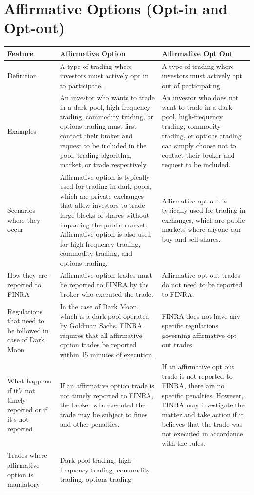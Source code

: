 \documentclass[11pt]{article}
\begin{document}
\section{Affirmative Options (Opt-in and Opt-out)}
\label{sec:org4ed90ec}
\begin{center}
\begin{tabular}{lll}
\hline
Feature & Affirmative Option & Affirmative Opt Out\\[0pt]
\hline
Definition & A type of trading where investors must actively opt in to participate. & A type of trading where investors must actively opt out of participating.\\[0pt]
Examples & An investor who wants to trade in a dark pool, high-frequency trading, commodity trading, or options trading must first contact their broker and request to be included in the pool, trading algorithm, market, or trade respectively. & An investor who does not want to trade in a dark pool, high-frequency trading, commodity trading, or options trading can simply choose not to contact their broker and request to be included.\\[0pt]
Scenarios where they occur & Affirmative option is typically used for trading in dark pools, which are private exchanges that allow investors to trade large blocks of shares without impacting the public market. Affirmative option is also used for high-frequency trading, commodity trading, and options trading. & Affirmative opt out is typically used for trading in exchanges, which are public markets where anyone can buy and sell shares.\\[0pt]
How they are reported to FINRA & Affirmative option trades must be reported to FINRA by the broker who executed the trade. & Affirmative opt out trades do not need to be reported to FINRA.\\[0pt]
Regulations that need to be followed in case of Dark Moon & In the case of Dark Moon, which is a dark pool operated by Goldman Sachs, FINRA requires that all affirmative option trades be reported within 15 minutes of execution. & FINRA does not have any specific regulations governing affirmative opt out trades.\\[0pt]
What happens if it's not timely reported or if it's not reported & If an affirmative option trade is not timely reported to FINRA, the broker who executed the trade may be subject to fines and other penalties. & If an affirmative opt out trade is not reported to FINRA, there are no specific penalties. However, FINRA may investigate the matter and take action if it believes that the trade was not executed in accordance with the rules.\\[0pt]
Trades where affirmative option is mandatory & Dark pool trading, high-frequency trading, commodity trading, options trading & \\[0pt]
\hline
\end{tabular}
\end{center}
\end{document}
